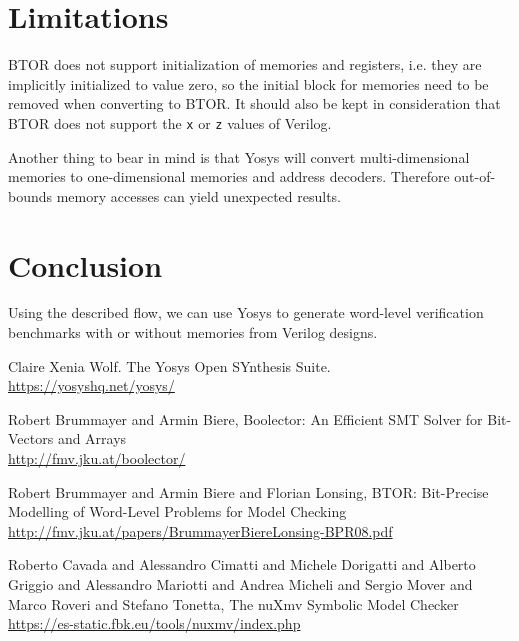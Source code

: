 \documentclass[9pt,technote,a4paper]{IEEEtran}
\begin{document}
\section{Limitations}

BTOR does not support initialization of memories and registers, i.e. they are
implicitly initialized to value zero, so the initial block for
memories need to be removed when converting to BTOR. It should
also be kept in consideration that BTOR does not support the {\tt x} or {\tt z}
values of Verilog.

Another thing to bear in mind is that Yosys will convert multi-dimensional
memories to one-dimensional memories and address decoders. Therefore
out-of-bounds memory accesses can yield unexpected results.

\section{Conclusion}

Using the described flow, we can use Yosys to generate word-level
verification benchmarks with or without memories from Verilog designs.

\begin{thebibliography}{9}

Claire Xenia Wolf. The Yosys Open SYnthesis Suite. \\
\url{https://yosyshq.net/yosys/}

Robert Brummayer and Armin Biere, Boolector: An Efficient SMT Solver for Bit-Vectors and Arrays\\
\url{http://fmv.jku.at/boolector/}

Robert Brummayer and Armin Biere and Florian Lonsing, BTOR:
Bit-Precise Modelling of Word-Level Problems for Model Checking\\
\url{http://fmv.jku.at/papers/BrummayerBiereLonsing-BPR08.pdf}

Roberto Cavada and Alessandro Cimatti and Michele Dorigatti and
Alberto Griggio and Alessandro Mariotti and Andrea Micheli and Sergio
Mover and Marco Roveri and Stefano Tonetta, The nuXmv Symbolic Model
Checker\\
\url{https://es-static.fbk.eu/tools/nuxmv/index.php}

\end{thebibliography}
\end{document}
